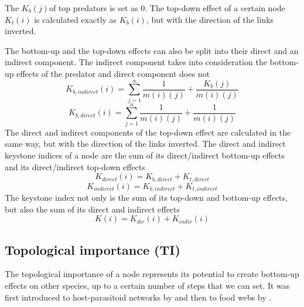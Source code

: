 \documentclass[twocolumn]{article}
\begin{document}
		The $K_b\left(j\right)$of top predators is set as 0.
		The top-down effect of a certain node $K_t\left(i\right)$ is calculated exactly as $K_b\left(i\right)$, but with the direction of the links inverted.
		\par
		The bottom-up and the top-down effects can also be split into their direct and an indirect component.
		The indirect component takes into consideration the bottom-up effects of the predator and direct component does not \begin{equation} K_{b,indirect}\left(i\right)=\sum_{j=1}^{n}\frac{1}{m\left(i\right)\left(j\right)}+\frac{K_b\left(j\right)}{m\left(i\right)\left(j\right)} \end{equation} \begin{equation} K_{b,direct}\left(i\right)=\sum_{j=1}^{n}\frac{1}{m\left(i\right)\left(j\right)}+\frac{1}{m\left(i\right)\left(j\right)} \end{equation} The direct and indirect components of the top-down effect are calculated in the same way, but with the direction of the links inverted.
		The direct and indirect keystone indices of a node are the sum of its direct/indirect bottom-up effects and its direct/indirect top-down effects \begin{equation} K_{direct}(i)=K_{b,direct}+K_{t,direct} \end{equation} \begin{equation} K_{indirect}(i)=K_{b,indirect}+K_{t,indirect} \end{equation} The keystone index not only is the sum of its top-down and bottom-up effects, but also the sum of its direct and indirect effects \begin{equation} K\left(i\right)=K_{dir}\left(i\right)+K_{indir}\left(i\right) \end{equation} \subsection*{Topological importance (TI)} The topological importance of a node represents its potential to create bottom-up effects on other species, up to a certain number of steps that we can set.
		It was first  introduced to host-parasitoid networks by \citet{Muller1999} and then to food webs by \citet{Jordan2003}.
\end{document}
